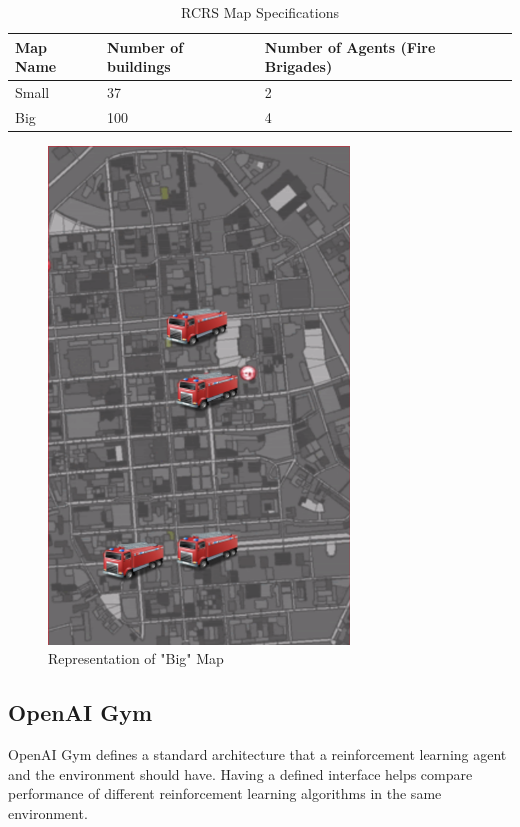 \documentclass[12pt]{report}
\begin{document}
\begin{table} [!h]
\begin{center}
 \begin{tabular}{l | l | l} 
 \hline
 Map Name & Number of buildings & Number of Agents (Fire Brigades)  \\ [0.5ex] 
 \hline\hline
 Small & 37 & 2\\
 Big & 100 & 4\\
 \hline
\end{tabular}
\caption{RCRS Map Specifications}
\label{table:RCRSMapSpecs}
\end{center}
\end{table}

\begin{figure}[!h]
    \centering
    \includegraphics[width=8cm]{BigMap.png}
    \caption{Representation of "Big" Map}
    \label{fig:BigMap}
\end{figure}


\subsection{OpenAI Gym} \label{OpenAIGym}

OpenAI Gym defines a standard architecture that a reinforcement learning agent and the environment should have. Having a defined interface helps compare performance of different reinforcement learning algorithms in the same environment. 
\end{document}
